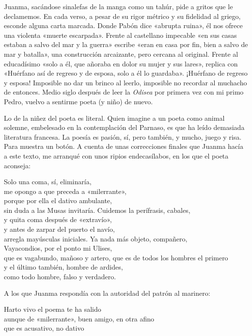 Juanma, sacándose sinalefas de la manga como un tahúr, pide a gritos que le declamemos. En cada verso, a pesar de su rigor métrico y su fidelidad al griego, esconde alguna carta marcada. Donde Pabón dice «abrupta ruina», él nos ofrece una violenta «muerte escarpada». Frente al castellano impecable «en sus casas estaban a salvo del mar y la guerra» escribe «eran en casa por fin, bien a salvo de mar y batalla», una construcción arcaizante, pero cercana al original. Frente al educadísimo «solo a él, que añoraba en dolor su mujer y sus lares», replica con «Huérfano así de regreso y de esposa, solo a él lo guardaba». ¡Huérfano de regreso y esposa! Imposible no dar un brinco al leerlo, imposible no recordar al muchacho de entonces. Medio siglo después de leer la \emph{Odisea} por primera vez con mi primo Pedro, vuelvo a sentirme poeta (y niño) de nuevo.

Lo de la niñez del poeta es literal. Quien imagine a un poeta como animal solemne, embelesado en la contemplación del Parnaso, es que ha leído demasiada literatura francesa. La poesía es pasión, sí, pero también, y mucho, juego y risa. Para muestra un botón. A cuenta de unas correcciones finales que Juanma hacía a este texto, me arranqué con unos ripios endecasílabos, en los que el poeta aconseja:

\begin{versopropio}
Solo una coma, sí, eliminaría,\\
me opongo a que preceda a «milerrante»,\\
porque por ella el dativo ambulante,\\
sin duda a las Musas invitaría.
\stanzabreak
Cuidemos la perífrasis, cabales,\\
y quita coma después de «extravío»,\\
y antes de zarpar del puerto el navío,\\
arregla mayúsculas iniciales.
\stanzabreak
Ya nada más objeto, compañero,\\
Vayacondios, por el ponto mi Ulises,\\
que es vagabundo, mañoso y artero,
\stanzabreak
que es de todos los hombres el primero\\
y el último también, hombre de ardides,\\
como todo hombre, falso y verdadero.
\end{versopropio}

A los que Juanma respondía con la autoridad del patrón al marinero:

\begin{versocita}
Harto vivo el poema te ha salido\\
aunque de «milerrante», buen amigo, en otra afino\\
que es acusativo, no dativo
\end{versocita}


